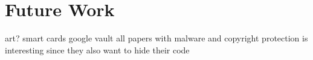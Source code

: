 \section{Future Work}\label{section:futureWork}
art?\newline
smart cards\newline
google vault\newline
all papers with malware and copyright protection is interesting since they also want to hide their code\newline
